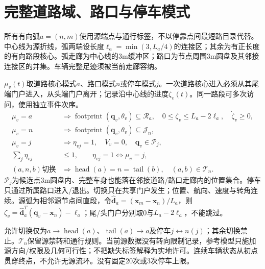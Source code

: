 \section{完整道路域、路口与停车模式}
\noindent 所有有向弧$a=(n,m)$使用源端点与通行标签，不以停靠点间最短路目录代替。中心线为源折线，弧两端设长度$\ell_a=\min(3,L_a/4)$的连接区；其余为有正长度的有向路段核心。弧走廊为中心线的3m缓冲区；路口为节点周围3m圆盘及其邻接连接区的并集。车辆完整足迹须被当前走廊容纳。

\noindent $\mu_v(t)$取道路核心模式$a$、路口模式$n$或停车模式$j$。一次道路核心进入必须从其尾端门户进入，从头端门户离开；记录沿中心线的进度$\zeta_v(t)$。同一路段可多次访问，使用独立事件次序。
\begin{align}
 \mu_v=a&\Rightarrow \operatorname{footprint}(\mathbf q_v,\theta_v)\subseteq\mathcal R_a,\quad
 0\le\zeta_v\le L_a-2\ell_a,\quad\dot\zeta_v\ge0,\\
 \mu_v=n&\Rightarrow\operatorname{footprint}(\mathbf q_v,\theta_v)\subseteq\mathcal J_n,\\
 \mu_v=j&\Rightarrow\eta_{vj}=1,\quad V_v=0,\quad
 \mathbf q_v\in\mathcal P_j,\label{eng:eq:roadfull}\\
 \sum_j\eta_{vj}&\le1,\qquad
 \eta_{vj}=1\Leftrightarrow\mu_v=j,\\
 (a,n,b)\text{切换}&\Rightarrow\operatorname{head}(a)=n=\operatorname{tail}(b),\quad
 (a,b)\in\mathcal T_n.\label{eng:eq:roadtransition}
\end{align}
\noindent $\mathcal P_j$为候选点3m圆盘内、完整车身也能落在邻接道路/路口走廊内的位置集合。停车只通过所属路口进入/退出。切换只在共享门户发生；位置、航向、速度与转角连续。源弧为相邻源节点间直段，令$\widehat{\mathbf d}_a=(\mathbf x_m-\mathbf x_n)/L_a$，则$\zeta_v=\widehat{\mathbf d}_a^T(\mathbf q_v-\mathbf x_n)-\ell_a$；尾/头门户分别取0与$L_a-2\ell_a$，不能跳过。

\noindent 允许切换仅为$a\to\operatorname{head}(a)$、$\operatorname{tail}(a)\to a$及停车$j\leftrightarrow n(j)$；其余切换禁止。$\mathcal T_n$保留源禁转和通行规则。当前源数据没有转向限制记录，参考模型只施加源方向/权限及几何可行性；不把缺失标签解释为实地许可。连续车辆状态从初点贯穿终点，不允许无源流环。没有固定20次或3次停车上限。
\clearpage

